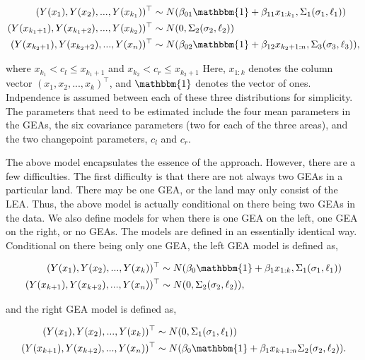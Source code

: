 \documentclass[12pt]{article}
\begin{document}
\begin{align}
(Y(x_1), Y(x_2), ..., Y(x_{k_1}))^{\top} &\sim N(\beta_{01}\mathbbm{1} + \beta_{11} x_{1:k_1}, \Sigma_1(\sigma_1, \ell_1)) \\
(Y(x_{k_1 + 1}), Y(x_{k_1 + 2}), ..., Y(x_{k_2}))^{\top} &\sim N(0, \Sigma_2(\sigma_2, \ell_2)) \\ 
(Y(x_{k_2 + 1}), Y(x_{k_2 + 2}), ..., Y(x_n))^{\top} &\sim N(\beta_{02}\mathbbm{1} + \beta_{12} x_{k_2 + 1:n}, \Sigma_3(\sigma_3, \ell_3)),
\end{align}

\noindent where \(x_{k_1} < c_l \leq x_{k_1 + 1}\) and
\(x_{k_2} < c_r \leq x_{k_2 + 1}\) Here, \(x_{1:k}\) denotes the column
vector \((x_1, x_2, ..., x_k)^\top\), and \(\mathbbm{1}\) denotes the
vector of ones. Indpendence is assumed between each of these three
distributions for simplicity. The parameters that need to be estimated
include the four mean parameters in the GEAs, the six covariance
parameters (two for each of the three areas), and the two changepoint
parameters, \(c_l\) and \(c_r\).

The above model encapsulates the essence of the approach. However, there
are a few difficulties. The first difficulty is that there are not
always two GEAs in a particular land. There may be one GEA, or the land
may only consist of the LEA. Thus, the above model is actually
conditional on there being two GEAs in the data. We also define models
for when there is one GEA on the left, one GEA on the right, or no GEAs.
The models are defined in an essentially identical way. Conditional on
there being only one GEA, the left GEA model is defined as,

\begin{align}
(Y(x_1), Y(x_2), ..., Y(x_{k}))^{\top} &\sim N(\beta_{0}\mathbbm{1} + \beta_{1} x_{1:k}, \Sigma_1(\sigma_1, \ell_1)) \\
(Y(x_{k + 1}), Y(x_{k + 2}), ..., Y(x_{n}))^{\top} &\sim N(0, \Sigma_2(\sigma_2, \ell_2)),
\end{align}

\noindent and the right GEA model is defined as,

\begin{align}
(Y(x_{1}), Y(x_{2}), ..., Y(x_{k}))^{\top} &\sim N(0, \Sigma_1(\sigma_1, \ell_1)) \\ 
(Y(x_{k + 1}), Y(x_{k + 2}), ..., Y(x_n))^{\top} &\sim N(\beta_{0}\mathbbm{1} + \beta_{1} x_{k + 1:n} \Sigma_2(\sigma_2, \ell_2)).
\end{align}
\end{document}
